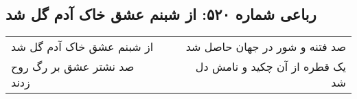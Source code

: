 \begin{center}
\section*{رباعی شماره ۵۲۰: از شبنم عشق خاک آدم گل شد}
\label{sec:0520}
\begin{longtable}{l p{0.5cm} r}
از شبنم عشق خاک آدم گل شد
&&
صد فتنه و شور در جهان حاصل شد
\\
صد نشتر عشق بر رگ روح زدند
&&
یک قطره از آن چکید و نامش دل شد
\\
\end{longtable}
\end{center}
